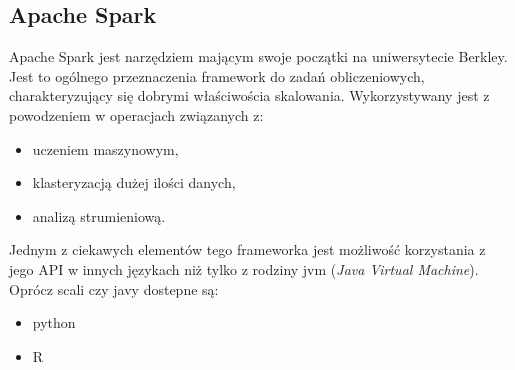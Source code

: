 \subsection{Apache Spark}
Apache Spark jest narzędziem mającym swoje początki na uniwersytecie Berkley.
Jest to ogólnego przeznaczenia framework do zadań obliczeniowych,
charakteryzujący się dobrymi właściwościa skalowania.
Wykorzystywany jest z powodzeniem w operacjach związanych z:
\begin{itemize}
  \item uczeniem maszynowym,
  \item klasteryzacją dużej ilości danych,
  \item analizą strumieniową.
\end{itemize}


Jednym z ciekawych elementów tego frameworka
jest możliwość korzystania z jego API w innych językach niż tylko z rodziny jvm (\textit{Java Virtual Machine}).
Oprócz scali czy javy dostepne są:
\begin{itemize}
  \item python
  \item R
\end{itemize}

